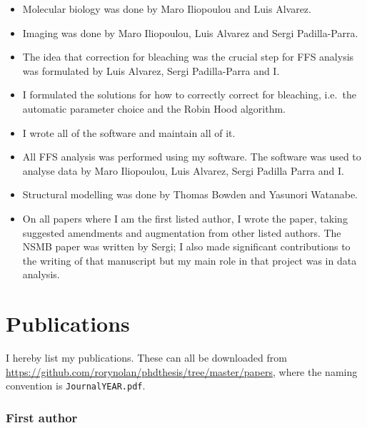 \documentclass[12pt,]{book}
\providecommand{\tightlist}{%
  \setlength{\itemsep}{0pt}\setlength{\parskip}{0pt}}
\theoremstyle{definition}
\theoremstyle{definition}
\theoremstyle{definition}
\theoremstyle{remark}
\begin{document}
\begin{itemize}
\tightlist
\item
  Molecular biology was done by Maro Iliopoulou and Luis Alvarez.
\item
  Imaging was done by Maro Iliopoulou, Luis Alvarez and Sergi
  Padilla-Parra.
\item
  The idea that correction for bleaching was the crucial step for FFS
  analysis was formulated by Luis Alvarez, Sergi Padilla-Parra and I.
\item
  I formulated the solutions for how to correctly correct for bleaching,
  i.e.~the automatic parameter choice and the Robin Hood algorithm.
\item
  I wrote all of the software and maintain all of it.
\item
  All FFS analysis was performed using my software. The software was
  used to analyse data by Maro Iliopoulou, Luis Alvarez, Sergi Padilla
  Parra and I.
\item
  Structural modelling was done by Thomas Bowden and Yasunori Watanabe.
\item
  On all papers where I am the first listed author, I wrote the paper,
  taking suggested amendments and augmentation from other listed
  authors. The NSMB paper \citep{HIVstoichiometry} was written by Sergi;
  I also made significant contributions to the writing of that
  manuscript but my main role in that project was in data analysis.
\end{itemize}

\section*{Publications}\label{publications}

I hereby list my publications. These can all be downloaded from
\url{https://github.com/rorynolan/phdthesis/tree/master/papers}, where
the naming convention is \texttt{JournalYEAR.pdf}.

\subsubsection*{First author}\label{first-author}
\end{document}
